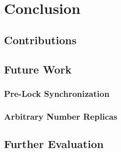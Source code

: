 \chapter{Conclusion}
\section{Contributions}
\section{Future Work}
\subsection{Pre-Lock Synchronization}
\subsection{Arbitrary Number Replicas}
\section{Further Evaluation}
